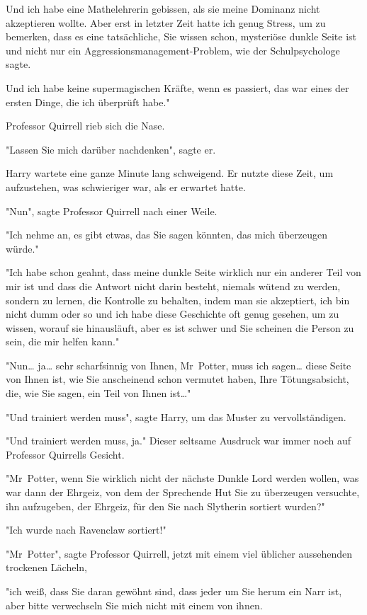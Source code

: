 {Und ich habe eine Mathelehrerin gebissen, als sie meine Dominanz nicht akzeptieren wollte. Aber erst in letzter Zeit hatte ich genug Stress, um zu bemerken, dass es eine tatsächliche, Sie wissen schon, mysteriöse dunkle Seite ist und nicht nur ein Aggressionsmanagement-Problem, wie der Schulpsychologe sagte.

Und ich habe keine supermagischen Kräfte, wenn es passiert, das war eines der ersten Dinge, die ich überprüft habe."

Professor Quirrell rieb sich die Nase.

"Lassen Sie mich darüber nachdenken", sagte er.

Harry wartete eine ganze Minute lang schweigend. Er nutzte diese Zeit, um aufzustehen, was schwieriger war, als er erwartet hatte.

"Nun", sagte Professor Quirrell nach einer Weile.

"Ich nehme an, es gibt etwas, das Sie sagen könnten, das mich überzeugen würde."

"Ich habe schon geahnt, dass meine dunkle Seite wirklich nur ein anderer Teil von mir ist und dass die Antwort nicht darin besteht, niemals wütend zu werden, sondern zu lernen, die Kontrolle zu behalten, indem man sie akzeptiert, ich bin nicht dumm oder so und ich habe diese Geschichte oft genug gesehen, um zu wissen, worauf sie hinausläuft, aber es ist schwer und Sie scheinen die Person zu sein, die mir helfen kann."

"Nun… ja… sehr scharfsinnig von Ihnen, Mr~Potter, muss ich sagen… diese Seite von Ihnen ist, wie Sie anscheinend schon vermutet haben, Ihre Tötungsabsicht, die, wie Sie sagen, ein Teil von Ihnen ist…"

"Und trainiert werden muss", sagte Harry, um das Muster zu vervollständigen.

"Und trainiert werden muss, ja." Dieser seltsame Ausdruck war immer noch auf Professor Quirrells Gesicht.

"Mr~Potter, wenn Sie wirklich nicht der nächste Dunkle Lord werden wollen, was war dann der Ehrgeiz, von dem der Sprechende Hut Sie zu überzeugen versuchte, ihn aufzugeben, der Ehrgeiz, für den Sie nach Slytherin sortiert wurden?"

"Ich wurde nach Ravenclaw sortiert!"

"Mr~Potter", sagte Professor Quirrell, jetzt mit einem viel üblicher aussehenden trockenen Lächeln,

"ich weiß, dass Sie daran gewöhnt sind, dass jeder um Sie herum ein Narr ist, aber bitte verwechseln Sie mich nicht mit einem von ihnen.

}
